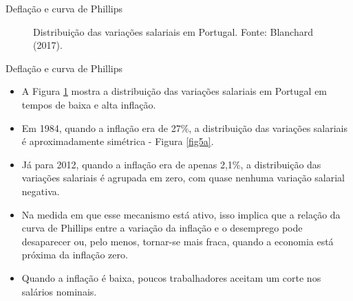 \documentclass[10pt]{beamer}
\begin{document}
\begin{frame}{Deflação e curva de Phillips}
    \begin{figure}
        \centering
        \qquad
        \caption{Distribuição das variações salariais em Portugal. Fonte: Blanchard (2017).}
        \label{fig5}
    \end{figure}
\end{frame}

\begin{frame}{Deflação e curva de Phillips}
    \begin{itemize}
        \item A Figura \ref{fig5} mostra a distribuição das variações salariais em Portugal em tempos de baixa e alta inflação.
        \bigskip
        \item Em 1984, quando a inflação era de 27\%, a distribuição das variações salariais é aproximadamente simétrica - Figura \ref{fig5a}.
        \bigskip
        \item Já para 2012, quando a inflação era de apenas 2,1\%, a distribuição das variações salariais é agrupada em zero, com quase nenhuma variação salarial negativa.
        \bigskip
        \item Na medida em que esse mecanismo está ativo, isso implica que a relação da curva de Phillips entre a variação da inflação e o desemprego pode desaparecer ou, pelo menos, tornar-se mais fraca, quando a economia está próxima da inflação zero.
        \bigskip
        \item Quando a inflação é baixa, poucos trabalhadores aceitam um corte nos salários nominais.
    \end{itemize}
\end{frame}
\end{document}
